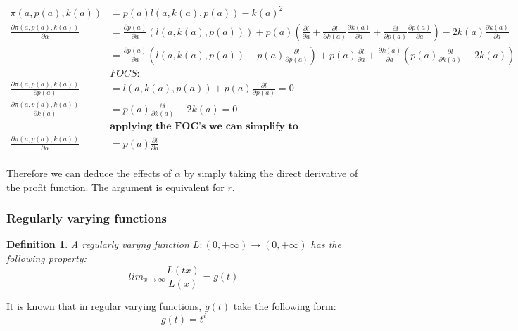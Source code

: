 \documentclass[12pt]{article}
\newtheorem{definition}{Definition}
\numberwithin{equation}{section}
\begin{document}
\begin{align*}
\pi(a, p(a),k(a))&= p(a) l(a, k(a),p(a))-k(a)^2 \\
\frac{ \partial \pi(a, p(a),k(a))}{\partial \alpha}&= \frac{\partial p(a) }{\partial a } \left(
l(a, k(a),p(a)) \right)
+ p(a)\left( \frac{\partial l}{\partial a}
+\frac{\partial l}{\partial k(a)}\frac{\partial k(a)}{\partial a}
+\frac{\partial l}{\partial p(a)}\frac{\partial p(a)}{\partial a}
\right)
- 2 k(a) \frac{\partial k(a)}{\partial a}
\\ 
&= \frac{\partial p(a) }{\partial a } \left(
l(a, k(a),p(a)) +p(a) \frac{\partial l}{\partial p(a)} \right)
+ p(a) \frac{\partial l}{\partial a}
+\frac{\partial k(a)}{\partial a}\left( p(a)\frac{\partial l}{\partial k(a)}-2 k(a)
 \right) \\
&FOCS: 
\\
\frac{\partial \pi(a, p(a),k(a))}{\partial p(a)}&=l(a, k(a),p(a))+p(a) \frac{\partial l}{\partial p(a)}=0 
\\
\frac{\partial \pi(a, p(a),k(a))}{\partial k(a)}&=p(a) \frac{\partial l}{\partial k(a)} -2 k(a)=0
\\
&\textbf{applying the FOC's we can simplify to}
\\
\frac{ \partial \pi(a, p(a),k(a))}{\partial \alpha}&= 
p(a) \frac{\partial l}{\partial a} \\
\end{align*}

Therefore we can deduce the effects of $\alpha$ by simply taking the direct derivative of the profit function. The argument is equivalent for $r$.

\subsubsection{Regularly varying functions}\label{regul}

\begin{definition}
A regularly varyng function $L: (0,+ \infty) \rightarrow (0,+ \infty)$ has the following property:
\begin{equation}
lim_{x \rightarrow \infty} \frac{L(t x)}{L(x)} = g(t)
\end{equation}
\end{definition}

It is known that in regular varying functions, $g(t)$ take the following form\citep{bojanic1963slowly}:
\begin{equation}
g(t)=t^i
\end{equation}
\end{document}

